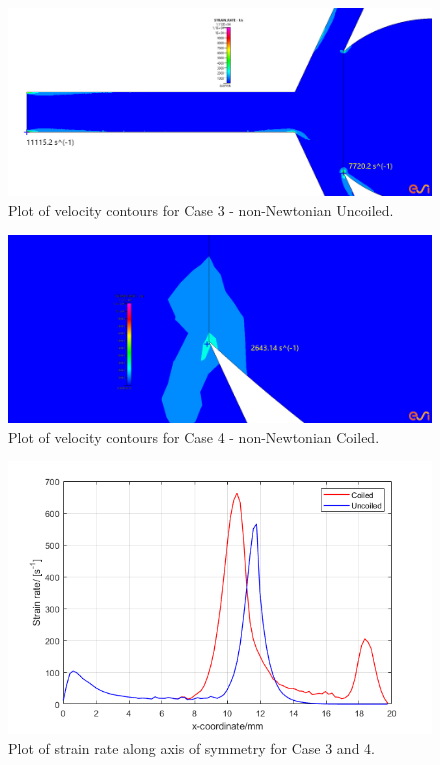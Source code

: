 \documentclass[journal,twoside,web]{ieeecolor}
\begin{document}
\begin{figure}[!t]
    \centerline{\includegraphics[width=\columnwidth]{img/geom17Strain.png}}
    \caption{Plot of velocity contours for Case 3 - non-Newtonian Uncoiled.}
    \label{geom17S}
\end{figure}
\begin{figure}[!t]
    \centerline{\includegraphics[width=\columnwidth]{img/geom18Strain.png}}
    \caption{Plot of velocity contours for Case 4 - non-Newtonian Coiled.}
    \label{geom18S}
\end{figure}
\begin{figure}[!t]
    \centerline{\includegraphics[width=\columnwidth]{img/fig4.png}}
    \caption{Plot of strain rate along axis of symmetry for Case 3 and 4.}
    \label{strain1}
\end{figure}
\end{document}
